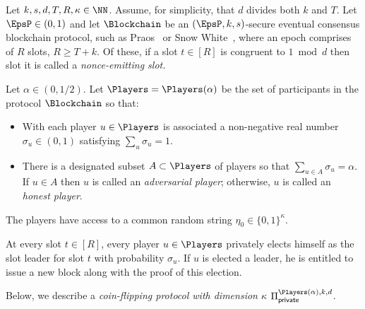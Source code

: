 


Let $k,s,d,T, R, \kappa \in \NN$. 
Assume, for simplicity, that $d$ divides both $k$ and $T$. 
Let $\EpsP \in (0,1)$ and 
let $\Blockchain$ be an $(\EpsP, k, s)$-secure eventual consensus blockchain protocol, 
such as Praos~\cite{Praos} or Snow White~\cite{SnowWhite}, 
where an epoch comprises of $R$ slots, $R \geq T + k$. 
Of these, if a slot $t \in [R]$ is congruent to  $1 \bmod d$ 
then slot it is called a \emph{nonce-emitting slot.} 

Let $\alpha \in (0, 1/2)$. 
Let $\Players = \Players(\alpha)$ be the set of participants 
in the protocol $\Blockchain$ so that: 
\begin{itemize}
	\item With each player $u \in \Players$ 
	is associated a non-negative real number $\sigma_u \in (0, 1)$ 
	satisfying $\sum_u \sigma_u = 1$. 

	\item There is a designated subset $A \subset \Players$ of players 
	so that 
	$\sum_{u \in A} \sigma_u = \alpha$. 
	If $u \in A$ then $u$ is called an \emph{adversarial player}; 
	otherwise, $u$ is called an \emph{honest player}.
\end{itemize}
The players have access to 
a common random string $\eta_0 \in \{0,1\}^\kappa$.

At every slot $t \in [R]$, 
every player $u \in \Players$ 
privately elects himself as the slot leader for slot $t$ 
with probability $\sigma_u$. 
If $u$ is elected a leader, 
he is entitled to issue a new block 
along with the proof of this election. 

\newcommand{\CoinTossingPrivate}{\Pi_\mathsf{private}^{\Players(\alpha),k,d}}
Below, we describe a \emph{coin-flipping protocol with dimension $\kappa$} $\CoinTossingPrivate$. 


